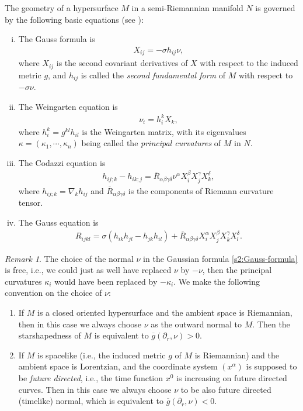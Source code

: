 \documentclass[11pt,reqno]{amsart}
\theoremstyle{definition}
\theoremstyle{remark}
\newtheorem{rem}{Remark}
\numberwithin{equation}{section}
\renewcommand{\(}{\left(}
\renewcommand{\)}{\right)}
\renewcommand{\~}{\tilde}
\renewcommand{\-}{\overline}
\renewcommand{\a}{\alpha}
\renewcommand{\b}{\beta}
\newcommand{\g}{\gamma}
\renewcommand{\d}{\delta}
\renewcommand{\k}{\kappa}
\newcommand{\s}{\sigma}
\begin{document}
The geometry of a hypersurface $M$ in a semi-Riemannian manifold $N$ is governed by the following basic equations (see \cite[(1.1.6),(1.1.21),(1.1.36),(1.1.37)]{Gerh06}):
\begin{enumerate}[(i)]
	\item The Gauss formula is
\begin{align}\label{s2:Gauss-formula}
X_{ij}=-\s h_{ij} \nu,  
\end{align}
where $X_{ij}$ is the second covariant derivatives of $X$ with respect to the induced metric $g$, and $h_{ij}$ is called the {\em second fundamental form} of $M$ with respect to $-\s \nu$.
\item The Weingarten equation is
\begin{align}\label{s2:Weingarten-eq}
\nu_{i}=h_i^k X_k,
\end{align}
where $h_i^k=g^{kl}h_{il}$ is the Weingarten matrix, with its eigenvalues $\k=(\k_1,\cdots,\k_n)$ being called the {\em principal curvatures} of $M$ in $N$.
\item The Codazzi equation is
\begin{align}\label{s2:Codazzi-formula}
h_{ij;k}-h_{ik;j}=\-R_{\a\b\g\d} \nu^\a X_i^\b X_j^\g X_k^\d,
\end{align}
where $h_{ij;k}=\nabla_k h_{ij}$ and $\-R_{\a\b\g\d}$ is the components of Riemann curvature tensor.
\item The Gauss equation is
\begin{align}\label{s2:Gauss-equation}
R_{ijkl}=\s(h_{ik}h_{jl}-h_{jk}h_{il})+\-R_{\a\b\g\d}X_i^\a X_j^\b X_k^\g X_l^\d.
\end{align}
\end{enumerate}
\begin{rem}
	The choice of the normal $\nu$ in the Gaussian formula \eqref{s2:Gauss-formula} is free, i.e., we could just as well have replaced $\nu$ by $-\nu$, then the principal curvatures $\k_i$ would have been replaced by $-\k_i$. We make the following convention on the choice of $\nu$:
    \begin{enumerate}[(1)]
    	\item If $M$ is a closed oriented hypersurface and the ambient space is Riemannian, then in this case we always choose $\nu$ as the outward normal to $M$. Then the starshapedness of $M$ is equivalent to $\-g(\partial_r,\nu)>0$. 
    	\item If $M$ is spacelike (i.e., the induced metric $g$ of $M$ is Riemannian) and the ambient space is Lorentzian, and the coordinate system $(x^\a)$ is supposed to be {\em future directed}, i.e., the time function $x^0$ is increasing on future directed curves. Then in this case we always choose $\nu$ to be also future directed (timelike) normal, which is equivalent to $\-g(\partial_r,\nu)<0$.		
    \end{enumerate}
\end{rem}
	
\end{document}
